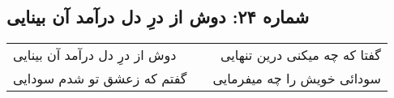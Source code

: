 \begin{center}
\section*{شماره ۲۴: دوش از درِ دل درآمد آن بینایی}
\label{sec:024}
\begin{longtable}{l p{0.5cm} r}
دوش از درِ دل درآمد آن بینایی
&&
گفتا که چه میکنی درین تنهایی
\\
گفتم که زعشق تو شدم سودایی
&&
سودائی خویش را چه میفرمایی
\\
\end{longtable}
\end{center}

